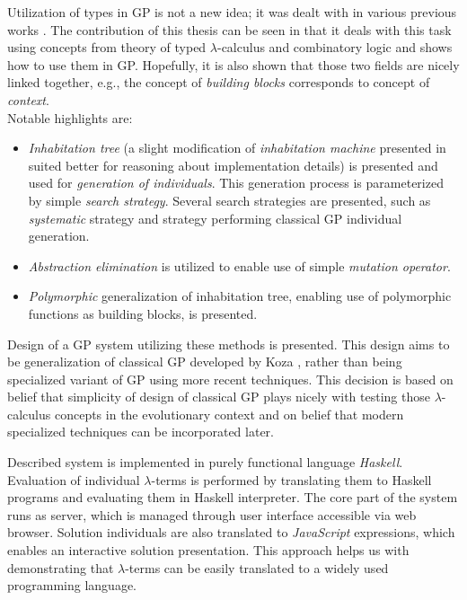 \documentclass[12pt,a4paper]{report}
\newcommand{\lterms}{$\lambda$-terms\xspace}
\begin{document}
Utilization of types in GP is not a new idea; 
it was dealt with in various previous works 
\cite{yu01,montana95,haynes96,olsson94}.
The contribution of this thesis can be seen 
in that it deals with this task using concepts from
theory of typed $\lambda$-calculus and combinatory logic
and shows how to use them in GP.
Hopefully, it is also shown that those two fields are
nicely linked together, e.g., the concept of \textit{building blocks}
corresponds to concept of \textit{context}. \\
 
Notable highlights are: 
\begin{itemize}
 \item \textit{Inhabitation tree} (a slight modification 
   of \textit{inhabitation machine} presented in \cite{barendregt10}
   suited better for reasoning about implementation details) 
   is presented and used for \textit{generation of individuals}.
   This generation process is parameterized by simple 
   \textit{search strategy}. Several search strategies are presented,
   such as \textit{systematic} strategy and strategy performing
   classical GP individual generation.     
 \item \textit{Abstraction elimination} is utilized
   to enable use of simple \textit{mutation operator}.
 \item \textit{Polymorphic} generalization of inhabitation tree,
   enabling use of polymorphic functions as building blocks, 
   is presented. 

\end{itemize}

Design of a GP system utilizing these methods is presented.
This design aims to be generalization of classical GP 
developed by Koza \cite{koza92}, rather than being 
specialized variant of GP using more recent techniques.
This decision is based on belief
that simplicity of design of classical GP plays nicely
with testing those $\lambda$-calculus concepts in 
the evolutionary context and on belief that modern specialized 
techniques can be incorporated later.
 
Described system is implemented in purely functional language 
\textit{Haskell}. Evaluation of individual \lterms is 
performed by translating them to
Haskell programs and evaluating them in Haskell interpreter. 
The core part of the system runs as server, which is 
managed through user interface accessible via
web browser. Solution individuals are also translated
to \textit{JavaScript} expressions, which enables  
an interactive solution presentation.
This approach helps us with demonstrating 
that \lterms can be easily translated to a 
widely used programming language.
\end{document}
